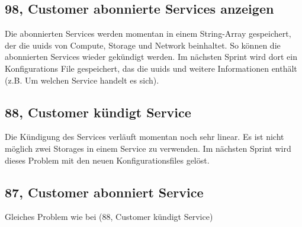 \documentclass[11pt]{scrartcl}
\begin{document}
\subsection{98, Customer abonnierte Services anzeigen}
Die abonnierten Services werden momentan in einem String-Array gespeichert, der die uuids von Compute, Storage und Network beinhaltet. So können die abonnierten Services wieder gekündigt werden.
Im nächsten Sprint wird dort ein Konfigurations File gespeichert, das die uuids und weitere Informationen enthält (z.B. Um welchen Service handelt es sich).

\subsection{88, Customer kündigt Service}
Die Kündigung des Services verläuft momentan noch sehr linear. Es ist nicht möglich zwei Storages in einem Service zu verwenden. Im nächsten Sprint wird dieses Problem mit den neuen Konfigurationsfiles gelöst.\\

\subsection{87, Customer abonniert Service}
Gleiches Problem wie bei (88, Customer kündigt Service)\\
\end{document}
